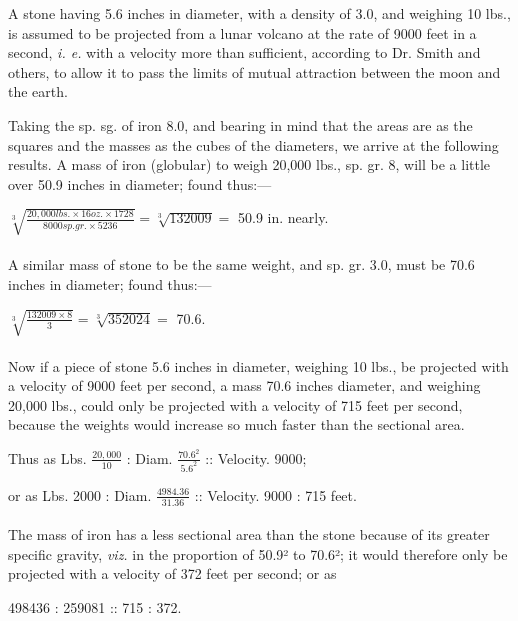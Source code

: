 \documentclass[a4paper, 12pt, oneside]{article}
\begin{document}
A stone having 5.6 inches in diameter, with a density of 3.0, and weighing 10 lbs., is assumed to be projected from a lunar volcano at the rate of 9000 feet in a second, \emph{i. e.} with a velocity more than sufficient, according to Dr. Smith and others, to allow it to pass the limits of mutual attraction between the moon and the earth.

Taking the sp. sg. of iron 8.0, and bearing in mind that the areas are as the squares and the masses as the cubes of the diameters, we arrive at the following results. A mass of iron (globular) to weigh 20,000 lbs., sp. gr. 8, will be a little over 50.9 inches in diameter; found thus:---
\begin{center}
\normalsize
$ \sqrt[3]{ \frac{20,000 lbs. \times 16 oz. \times 1728}{8000 sp. gr. \times 5236} } = \sqrt[3]{ 132009 } = $ 50.9 in. nearly.
\end{center}
\paragraph{}
A similar mass of stone to be the same weight, and sp. gr. 3.0, must be 70.6 inches in diameter; found thus:---
\begin{center}
\normalsize
$ \sqrt[3]{ \frac{132009 \times 8}{3} } = \sqrt[3]{ 352024 } = $ 70.6.
\end{center}
\paragraph{}
Now if a piece of stone 5.6 inches in diameter, weighing 10 lbs., be projected with a velocity of 9000 feet per second, a mass 70.6 inches diameter, and weighing 20,000 lbs., could only be projected with a velocity of 715 feet per second, because the weights would increase so much faster than the sectional area.
\begin{center}
\normalsize
Thus as Lbs. $\frac{20,000}{10}$ : Diam. $\frac{70.6^2}{5.6^2}$ :: Velocity. 9000;
\end{center}

\begin{center}
\normalsize
or as Lbs. 2000 : Diam. $\frac{4984.36}{31.36}$ :: Velocity. 9000 : 715 feet.
\end{center}
\paragraph{}
The mass of iron has a less sectional area than the stone because of its greater specific gravity, \emph{viz.} in the proportion of 50.9² to 70.6²; it would therefore only be projected with a velocity of 372 feet per second; or as
\begin{center}
\normalsize
498436 : 259081 :: 715 : 372.
\end{center}
\end{document}
